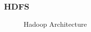 \begin{frame}[c]{ }
	\frametitle{HDFS }
		\begin{figure}
		\centering
		
		\caption{Hadoop Architecture } \label{fig:hdfs}
	\end{figure}
	

\end{frame}
%
